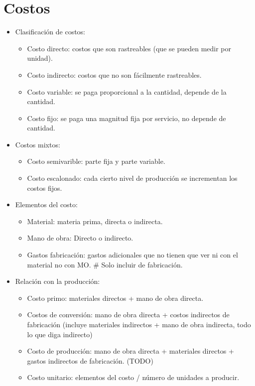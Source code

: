\documentclass{article}
\begin{document}
\section{Costos}
\begin{itemize}
    \item Clasificación de costos: 
        \begin{itemize}
            \item Costo directo: costos que son rastreables (que se pueden medir por unidad).
            \item Costo indirecto: costos que no son fácilmente rastreables. 
            \item Costo variable: se paga proporcional a la cantidad, depende de la cantidad. 
            \item Costo fijo: se paga una magnitud fija por servicio, no depende de cantidad. 
        \end{itemize}
    
    \item Costos mixtos: 
        \begin{itemize}
            \item Costo semivarible: parte fija y parte variable. 
            \item Costo escalonado: cada cierto nivel de producción se incrementan los costos fijos. 
        \end{itemize}

    \item Elementos del costo: 
        \begin{itemize}
            \item Material: materia prima, directa o indirecta.
            \item Mano de obra: Directo o indirecto.
            \item Gastos fabricación: gastos adicionales que no tienen que ver ni con el material no con MO. \# Solo incluir de fabricación. 
        \end{itemize}

    \item Relación con la producción:
        \begin{itemize}
            \item Costo primo: materiales directos + mano de obra directa.
            \item Costos de conversión: mano de obra directa + costos indirectos de fabricación (incluye materiales indirectos + mano de obra indirecta, todo lo que diga indirecto)
            \item Costo de producción: mano de obra directa +  materiales directos + gastos indirectos de fabricación. (TODO)
            \item Costo unitario: elementos del costo / número de unidades a producir.
        \end{itemize}
\end{itemize}




\end{document}
